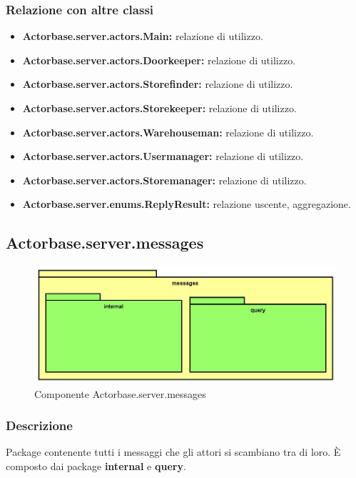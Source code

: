 \documentclass[a4paper]{article}
\begin{document}
			\subsubsection{Relazione con altre classi}
				\begin{itemize}
					\item \textbf{Actorbase.server.actors.Main:} relazione di utilizzo.
					\item \textbf{Actorbase.server.actors.Doorkeeper:} relazione di utilizzo.
					\item \textbf{Actorbase.server.actors.Storefinder:} relazione di utilizzo.
					\item \textbf{Actorbase.server.actors.Storekeeper:} relazione di utilizzo.
					\item \textbf{Actorbase.server.actors.Warehouseman:} relazione di utilizzo.
					\item \textbf{Actorbase.server.actors.Usermanager:} relazione di utilizzo.
					\item \textbf{Actorbase.server.actors.Storemanager:} relazione di utilizzo.
					\item \textbf{Actorbase.server.enums.ReplyResult:} relazione uscente, aggregazione.
				\end{itemize}
				
		\subsection{Actorbase.server.messages}
		
			\begin{figure}[H]
				\centering
				\includegraphics[width=\textwidth]{ST/Server/messagesLevel.jpg}
				\caption{Componente Actorbase.server.messages}
			\end{figure}
			
			\subsubsection{Descrizione}
				Package contenente tutti i messaggi che gli attori si scambiano tra di loro.
				È composto dai package \textbf{internal} e \textbf{query}.
				
\end{document}

